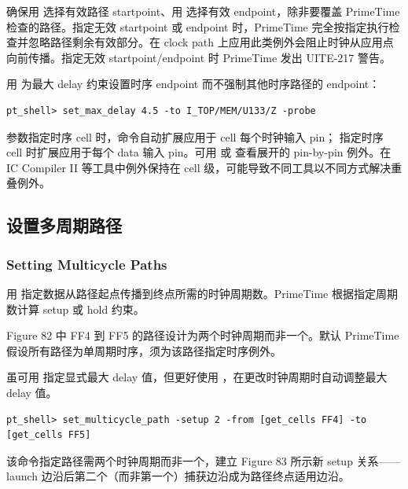 确保用  选择有效路径 startpoint、用  选择有效 endpoint，除非要覆盖 PrimeTime 检查的路径。指定无效 startpoint 或 endpoint 时，PrimeTime 完全按指定执行检查并忽略路径剩余有效部分。在 clock path 上应用此类例外会阻止时钟从应用点向前传播。指定无效 startpoint/endpoint 时 PrimeTime 发出 UITE-217 警告。

用  为最大 delay 约束设置时序 endpoint 而不强制其他时序路径的 endpoint：
\begin{lstlisting}
pt_shell> set_max_delay 4.5 -to I_TOP/MEM/U133/Z -probe
\end{lstlisting}

 参数指定时序 cell 时，命令自动扩展应用于 cell 每个时钟输入 pin； 指定时序 cell 时扩展应用于每个 data 输入 pin。可用  或  查看展开的 pin-by-pin 例外。在 IC Compiler II 等工具中例外保持在 cell 级，可能导致不同工具以不同方式解决重叠例外。


\subsection{设置多周期路径}
\subsubsection*{Setting Multicycle Paths}

用  指定数据从路径起点传播到终点所需的时钟周期数。PrimeTime 根据指定周期数计算 setup 或 hold 约束。


Figure 82 中 FF4 到 FF5 的路径设计为两个时钟周期而非一个。默认 PrimeTime 假设所有路径为单周期时序，须为该路径指定时序例外。

虽可用  指定显式最大 delay 值，但更好使用 ，在更改时钟周期时自动调整最大 delay 值。

\begin{lstlisting}
pt_shell> set_multicycle_path -setup 2 -from [get_cells FF4] -to [get_cells FF5]
\end{lstlisting}

该命令指定路径需两个时钟周期而非一个，建立 Figure 83 所示新 setup 关系——launch 边沿后第二个（而非第一个）捕获边沿成为路径终点适用边沿。


